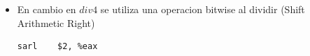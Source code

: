 \documentclass{article}
\begin{document}
\begin{enumerate}
\begin{itemize}
\item En cambio en $div4$ se utiliza una operacion bitwise al dividir (Shift Arithmetic Right)


\begin{lstlisting}[language={[x86masm]Assembler}, basicstyle=\small]
	sarl	$2, %eax
\end{lstlisting}
\end{itemize}




	\end{enumerate}


	
		
	
\end{document}
